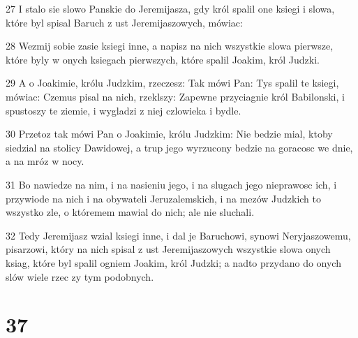 \par 27 I stalo sie slowo Panskie do Jeremijasza, gdy król spalil one ksiegi i slowa, które byl spisal Baruch z ust Jeremijaszowych, mówiac:
\par 28 Wezmij sobie zasie ksiegi inne, a napisz na nich wszystkie slowa pierwsze, które byly w onych ksiegach pierwszych, które spalil Joakim, król Judzki.
\par 29 A o Joakimie, królu Judzkim, rzeczesz: Tak mówi Pan: Tys spalil te ksiegi, mówiac: Czemus pisal na nich, rzeklszy: Zapewne przyciagnie król Babilonski, i spustoszy te ziemie, i wygladzi z niej czlowieka i bydle.
\par 30 Przetoz tak mówi Pan o Joakimie, królu Judzkim: Nie bedzie mial, ktoby siedzial na stolicy Dawidowej, a trup jego wyrzucony bedzie na goracosc we dnie, a na mróz w nocy.
\par 31 Bo nawiedze na nim, i na nasieniu jego, i na slugach jego nieprawosc ich, i przywiode na nich i na obywateli Jeruzalemskich, i na mezów Judzkich to wszystko zle, o któremem mawial do nich; ale nie sluchali.
\par 32 Tedy Jeremijasz wzial ksiegi inne, i dal je Baruchowi, synowi Neryjaszowemu, pisarzowi, który na nich spisal z ust Jeremijaszowych wszystkie slowa onych ksiag, które byl spalil ogniem Joakim, król Judzki; a nadto przydano do onych slów wiele rzec zy tym podobnych.

\chapter{37}


